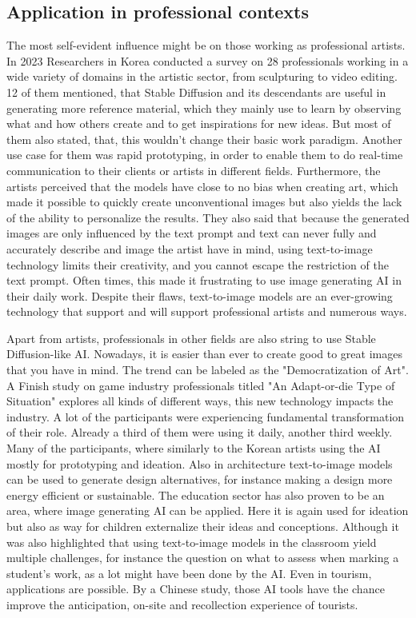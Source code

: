 \documentclass[11pt]{article}
\begin{document}
\subsection{Application in professional contexts}
The most self-evident influence might be on those working as professional artists. In 2023 Researchers in Korea conducted a survey on 28 professionals working in a wide variety of domains in the artistic sector, from sculpturing to video editing\cite{ko2023largescaletexttoimagegenartionmodelsforvisualartists}. 12 of them mentioned, that Stable Diffusion and its descendants are useful in generating more reference material, which they mainly use to learn by observing what and how others create and to get inspirations for new ideas. But most of them also stated, that, this wouldn't change their basic work paradigm. Another use case for them was rapid prototyping, in order to enable them to do real-time communication to their clients or artists in different fields. Furthermore, the artists perceived that the models have close to no bias when creating art, which made it possible to quickly create unconventional images but also yields the lack of the ability to personalize the results. They also said that because the generated images are only influenced by the text prompt and text can never fully and accurately describe and image the artist have in mind, using text-to-image technology limits their creativity, and you cannot escape the restriction of the text prompt. Often times, this made it frustrating to use image generating AI in their daily work. Despite their flaws, text-to-image models are an ever-growing technology that support and will support professional artists and numerous ways.

Apart from artists, professionals in other fields are also string to use Stable Diffusion-like AI. Nowadays, it is easier than ever to create good to great images that you have in mind. The trend can be labeled as the "Democratization of Art". A Finish study on game industry professionals\cite{vimpari2023texttoimagegenerationaibygameprofessionals} titled "An Adapt-or-die Type of Situation" explores all kinds of different ways, this new technology impacts the industry. A lot of the participants were experiencing fundamental transformation of their role. Already a third of them were using it daily, another third weekly. Many of the participants, where similarly to the Korean artists using the AI mostly for prototyping and ideation. Also in architecture\cite{sekban2022artandarchtitecture} text-to-image models can be used to generate design alternatives, for instance making a design more energy efficient or sustainable. The education sector has also proven to be an area, where image generating AI can be applied\cite{vartiainen2023aiincraftseducation}. Here it is again used for ideation but also as way for children externalize their ideas and conceptions. Although it was also highlighted that using text-to-image models in the classroom yield multiple challenges, for instance the question on what to assess when marking a student's work, as a lot might have been done by the AI. Even in tourism, applications are possible. By a Chinese study\cite{miao2023aiintourism}, those AI tools have the chance improve the anticipation, on-site and recollection experience of tourists. 
\end{document}
